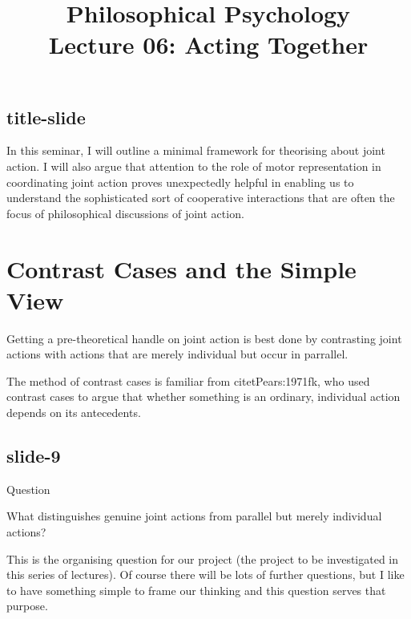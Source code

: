 \documentclass[12pt,\papersize]{extarticle}
\begin{document}
\setlength\footnotesep{1em}










\title {Philosophical Psychology \\ Lecture 06: Acting Together}



\maketitle

\subsection{title-slide}
In this seminar, I will outline a minimal framework for theorising
about joint action.
I will also argue that attention to the role of
motor representation in coordinating joint action
proves unexpectedly helpful in enabling us to understand
the sophisticated sort of cooperative interactions that are often
the focus of philosophical discussions of joint action.



\section{Contrast Cases and the Simple View}

Getting a pre-theoretical handle on joint action is best done by contrasting
joint actions with actions that are merely individual but occur in parrallel.

The method of contrast cases is familiar from citet{Pears:1971fk}, who used
contrast cases to argue that whether something is an ordinary, individual action
depends on its antecedents.

\subsection{slide-9}
Question



What distinguishes genuine joint actions from parallel but merely individual actions?



This is the organising question for our project (the project to be investigated in this
series of lectures).  Of course there will be lots of further questions, but I like to
have something simple to frame our thinking and this question serves that purpose.
\end{document}
